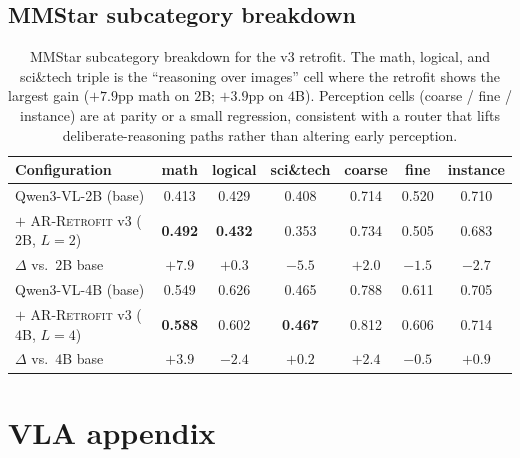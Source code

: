\documentclass{article}
\newcommand{\retrofit}{\textsc{AR-Retrofit}}
\begin{document}
\subsection{MMStar subcategory breakdown}
\label{app:mmstar_subcat}
\begin{table}[h]
\caption{MMStar subcategory breakdown for the v3 retrofit. The math, logical, and sci\&tech triple is the ``reasoning over images'' cell where the retrofit shows the largest gain ($+7.9$pp math on $2$B; $+3.9$pp on $4$B). Perception cells (coarse / fine / instance) are at parity or a small regression, consistent with a router that lifts deliberate-reasoning paths rather than altering early perception.}
\label{tab:mmstar_subcat}
\centering\small
\setlength{\tabcolsep}{4pt}
\begin{tabular}{lcccccc}
\toprule
Configuration & math & logical & sci\&tech & coarse & fine & instance \\
\midrule
Qwen3-VL-2B (base)                       & 0.413 & 0.429 & 0.408 & 0.714 & 0.520 & 0.710 \\
$+$ \retrofit{} v3 ($2$B, $L{=}2$)       & \textbf{0.492} & \textbf{0.432} & 0.353 & 0.734 & 0.505 & 0.683 \\
$\Delta$ vs.\ $2$B base                   & $\mathbf{+7.9}$ & $+0.3$ & $-5.5$ & $+2.0$ & $-1.5$ & $-2.7$ \\
\midrule
Qwen3-VL-4B (base)                       & 0.549 & 0.626 & 0.465 & 0.788 & 0.611 & 0.705 \\
$+$ \retrofit{} v3 ($4$B, $L{=}4$)       & \textbf{0.588} & 0.602 & \textbf{0.467} & 0.812 & 0.606 & 0.714 \\
$\Delta$ vs.\ $4$B base                   & $\mathbf{+3.9}$ & $-2.4$ & $+0.2$ & $+2.4$ & $-0.5$ & $+0.9$ \\
\bottomrule
\end{tabular}
\end{table}

\section{VLA appendix}
\label{app:vla_section}
\end{document}
